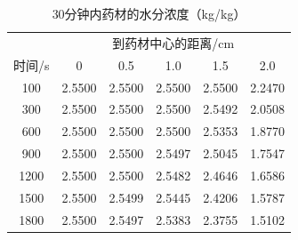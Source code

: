 \begin{table}[htbp]\centering\small
\caption{30分钟内药材的水分浓度（kg/kg）}\label{tab_q1C}
\renewcommand{\arraystretch}{1.12}
\begin{tabular}{cccccc}\toprule
 & \multicolumn{5}{c}{到药材中心的距离/cm}\\
时间/s & 0 & 0.5 & 1.0 & 1.5 & 2.0\\\midrule
100 & 2.5500 & 2.5500 & 2.5500 & 2.5500 & 2.2470\\
300 & 2.5500 & 2.5500 & 2.5500 & 2.5492 & 2.0508\\
600 & 2.5500 & 2.5500 & 2.5500 & 2.5353 & 1.8770\\
900 & 2.5500 & 2.5500 & 2.5497 & 2.5045 & 1.7547\\
1200 & 2.5500 & 2.5500 & 2.5482 & 2.4646 & 1.6586\\
1500 & 2.5500 & 2.5499 & 2.5445 & 2.4206 & 1.5787\\
1800 & 2.5500 & 2.5497 & 2.5383 & 2.3755 & 1.5102\\
\bottomrule\end{tabular}
\end{table}
